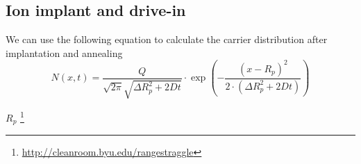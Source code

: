 \subsection{Ion implant and drive-in}
We can use the following equation to calculate the carrier distribution after implantation and annealing
\begin{equation}
N(x,t)
=
\frac{Q}{\sqrt{2\pi} \sqrt{\Delta R_p^2+2 D t}}
\cdot
\exp\left(
-\frac{(x-R_p)^2}{2 \cdot (\Delta R_p^2+2 D t)}
\right)
\end{equation}

 $R_p$
\footnote{\url{http://cleanroom.byu.edu/rangestraggle}}
